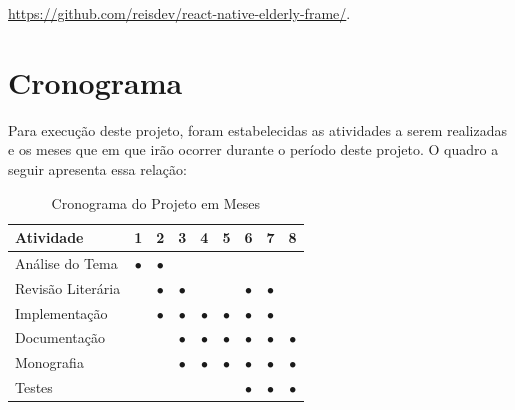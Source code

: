 \documentclass[
	12pt,				    %
	openright,			    %
	oneside,			    %
	a4paper,			    %
    sumario=tradicional,    %
	english,			    %
	brazil,				    %
	]{abntex2}              %
\begin{document}
\href{https://github.com/reisdev/react-native-elderly-frame/}{https://github.com/reisdev/react-native-elderly-frame/}.

\chapter{Cronograma}\label{sec:cronograma}

Para execução deste projeto, foram estabelecidas as atividades a serem realizadas e os meses que em que irão ocorrer durante o período deste projeto. O quadro a seguir apresenta essa relação:

\par

\begin{table}[htbp]
	\centering
	\caption[Cronograma mensal]{Cronograma do Projeto em Meses}
	\label{tab:cronogramaMensal}
	\begin{tabular}{lcccccccc} %
		\toprule
		\textbf{Atividade} & \textbf{1} & \textbf{2} & \textbf{3} & \textbf{4} & \textbf{5} & \textbf{6} & \textbf{7} & \textbf{8} \\
		\midrule
		Análise do Tema    & $\bullet$  & $\bullet$  &            &            &            &            &            &            \\
		Revisão Literária  &            & $\bullet$  & $\bullet$  &            &            & $\bullet$  & $\bullet$  &            \\
		Implementação      &            & $\bullet$  & $\bullet$  & $\bullet$  & $\bullet$  & $\bullet$  & $\bullet$  &            \\
		Documentação       &            &            & $\bullet$  & $\bullet$  & $\bullet$  & $\bullet$  & $\bullet$  & $\bullet$  \\
		Monografia         &            &            & $\bullet$  & $\bullet$  & $\bullet$  & $\bullet$  & $\bullet$  & $\bullet$  \\
		Testes             &            &            &            &            &            & $\bullet$  & $\bullet$  & $\bullet$  \\
		\bottomrule
	\end{tabular}
\end{table}



\end{document}
